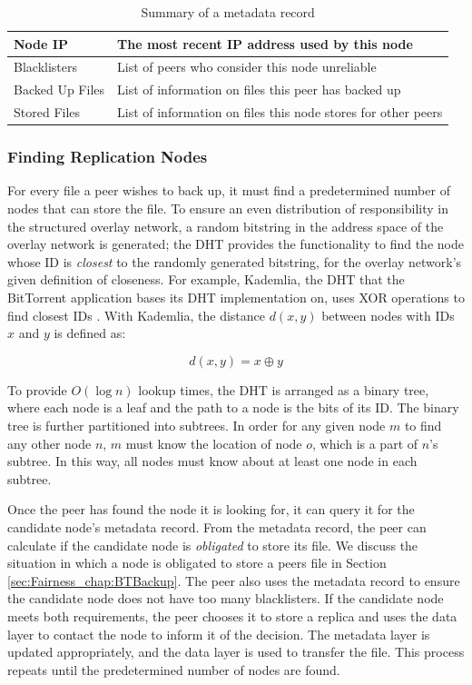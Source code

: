 \documentclass[12pt]{report}
\begin{document}
\begin{table}
\begin{center}
    \begin{tabular}{| l | l |}
    \hline
    Node IP & The most recent IP address used by this node\\ \hline
    Blacklisters & List of peers who consider this node unreliable\\ \hline
    Backed Up Files & List of information on files this peer has backed up \\ \hline
    Stored Files & List of information on files this node stores for other peers \\ \hline
    \end{tabular}
    \caption{Summary of a metadata record}
    \label{tab:metadataRecord}
\end{center}
\end{table}

\subsubsection{Finding Replication Nodes} \label{subsubsec:FindingReplicationNodes}

For every file a peer wishes to back up, it must find a predetermined number of nodes that can store the file. To ensure an even distribution of responsibility in the structured overlay network, a random bitstring in the address space of the overlay network is generated; the DHT provides the functionality to find the node whose ID is \textit{closest} to the randomly generated bitstring, for the overlay network's given definition of closeness. For example, Kademlia, the DHT that the BitTorrent application bases its DHT implementation on, uses XOR operations to find closest IDs \cite{kademliaDHT}. With Kademlia, the distance $d(x,y)$ between nodes with IDs $x$ and $y$ is defined as:

$$
d(x,y)=x \oplus y
$$

To provide $O(\log n)$ lookup times, the DHT is arranged as a binary tree, where each node is a leaf and the path to a node is the bits of its ID. The binary tree is further partitioned into subtrees. In order for any given node $m$ to find any other node $n$, $m$ must know the location of node $o$, which is a part of $n$'s subtree. In this way, all nodes must know about at least one node in each subtree.

Once the peer has found the node it is looking for, it can query it for the candidate node's metadata record. From the metadata record, the peer can calculate if the candidate node is \textit{obligated} to store its file. We discuss the situation in which a node is obligated to store a peers file in Section \ref{sec:Fairness_chap:BTBackup}. The peer also uses the metadata record to ensure the candidate node does not have too many blacklisters. If the candidate node meets both requirements, the peer chooses it to store a replica and uses the data layer to contact the node to inform it of the decision. The metadata layer is updated appropriately, and the data layer is used to transfer the file. This process repeats until the predetermined number of nodes are found.
\end{document}
